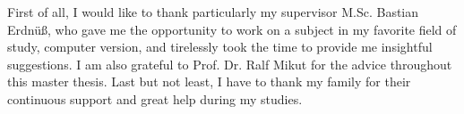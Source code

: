 
First of all, I would like to thank particularly my supervisor M.Sc. Bastian Erdnüß, who gave me the opportunity to work on a subject in my favorite field of study, computer version, and tirelessly took the time to provide me insightful suggestions. I am also grateful to Prof. Dr. Ralf Mikut for the advice throughout this master thesis. Last but not least, I have to thank my family for their continuous support and great help during my studies.